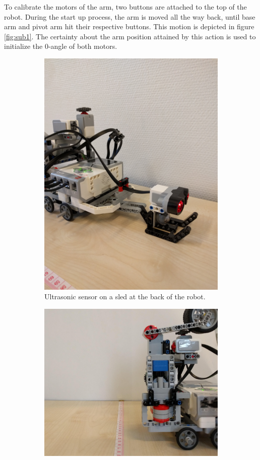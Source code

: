 \documentclass[11pt, a4paper]{article}
\begin{document}
To calibrate the motors of the arm, two buttons are attached to the top of the robot. During the start up process, the arm is moved all the way back, until base arm and pivot arm hit their respective buttons. This motion is depicted in figure \ref{fig:sub1}. The certainty about the arm position attained by this action is used to initialize the 0-angle of both motors.

\begin{figure}
	\centering

	\begin{subfigure}{.4\textwidth}
		\centering
		\includegraphics[width=0.8\linewidth]{images/crawl_sled}
		\caption{Ultrasonic sensor on a sled at the back of the robot.}
		\label{fig:sub2}
	\end{subfigure}
	\begin{subfigure}{.4\textwidth}
		\centering
		\includegraphics[width=1\linewidth]{images/crawl_calibrate}

\end{subfigure}
\end{figure}
\end{document}
